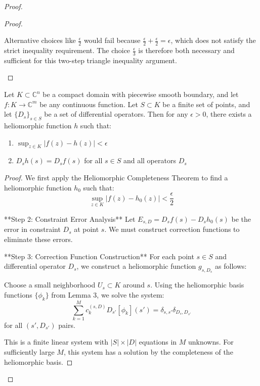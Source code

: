 \begin{proof}
\begin{proof}
\begin{remark}
Alternative choices like $\frac{\epsilon}{2}$ would fail because $\frac{\epsilon}{2} + \frac{\epsilon}{2} = \epsilon$, which does not satisfy the strict inequality requirement. The choice $\frac{\epsilon}{3}$ is therefore both necessary and sufficient for this two-step triangle inequality argument.
\end{remark}
\end{proof}

\begin{theorem}
Let $K \subset \mathbb{C}^n$ be a compact domain with piecewise smooth boundary, and let $f: K \rightarrow \mathbb{C}^m$ be any continuous function. Let $S \subset K$ be a finite set of points, and let $\{D_s\}_{s \in S}$ be a set of differential operators. Then for any $\epsilon > 0$, there exists a heliomorphic function $h$ such that:
\begin{enumerate}
    \item $\sup_{z \in K} |f(z) - h(z)| < \epsilon$
    \item $D_sh(s) = D_sf(s)$ for all $s \in S$ and all operators $D_s$
\end{enumerate}
\end{theorem}

\begin{proof}
We first apply the Heliomorphic Completeness Theorem to find a heliomorphic function $h_0$ such that:
\begin{equation}
\sup_{z \in K} |f(z) - h_0(z)| < \frac{\epsilon}{2}
\end{equation}

**Step 2: Constraint Error Analysis**
Let $E_{s,D} = D_sf(s) - D_sh_0(s)$ be the error in constraint $D_s$ at point $s$. We must construct correction functions to eliminate these errors.

**Step 3: Correction Function Construction**
For each point $s \in S$ and differential operator $D_s$, we construct a heliomorphic function $g_{s,D_s}$ as follows:

Choose a small neighborhood $U_s \subset K$ around $s$. Using the heliomorphic basis functions $\{\phi_k\}$ from Lemma 3, we solve the system:
$$\sum_{k=1}^{M} c_k^{(s,D)} D_{s'}[\phi_k](s') = \delta_{s,s'}\delta_{D_s,D_{s'}}$$
for all $(s', D_{s'})$ pairs.

This is a finite linear system with $|S| \times |D|$ equations in $M$ unknowns. For sufficiently large $M$, this system has a solution by the completeness of the heliomorphic basis.


\end{proof}
\end{proof}
